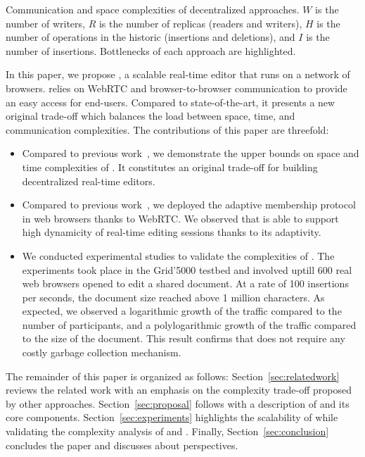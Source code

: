 \begin{table*}[t]
  \centering
  
  \caption{\label{table:complexities}
    Communication and space complexities of decentralized approaches.
    $W$ is the number of writers, 
    $R$ is the number of replicas (readers and writers),
    $H$ is the number of operations in the historic (insertions and deletions),
    and $I$ is the number of insertions.
    Bottlenecks of each approach are highlighted.}
\end{table*}

In this paper, we propose \CRATE, a scalable real-time editor that runs on a
network of browsers. \CRATE relies on WebRTC and browser-to-browser
communication to provide an easy access for end-users. Compared to
state-of-the-art, it presents a new original trade-off which balances the load
between space, time, and communication complexities. The contributions of this
paper are threefold:
\begin{itemize}
\item Compared to previous work~\cite{nedelec2013lseq}, we demonstrate the upper
  bounds on space and time complexities of \LSEQ. It constitutes an original
  trade-off for building decentralized real-time editors.
\item Compared to previous work~\cite{nedelec2015spray}, we deployed the
  adaptive membership protocol \SPRAY in web browsers thanks to
  WebRTC. We observed that \SPRAY is able to support high dynamicity
  of real-time editing sessions thanks to its adaptivity.
\item We conducted experimental studies to validate the complexities of
  \CRATE. The experiments took place in the Grid'5000 testbed and involved
  uptill $600$ real web browsers opened to edit a shared document. At a rate of
  100 insertions per seconds, the document size reached above 1 million
  characters. As expected, we observed a logarithmic growth of the traffic
  compared to the number of participants, and a polylogarithmic growth of the
  traffic compared to the size of the document. This result confirms that \CRATE
  does not require any costly garbage collection mechanism.
\end{itemize}

The remainder of this paper is organized as follows:
Section~\ref{sec:relatedwork} reviews the related work with an emphasis on the
complexity trade-off proposed by other approaches. Section~\ref{sec:proposal}
follows with a description of \CRATE and its core
components. Section~\ref{sec:experiments} highlights the scalability of \CRATE
while validating the complexity analysis of \LSEQ and \SPRAY. Finally,
Section~\ref{sec:conclusion} concludes the paper and discusses about
perspectives.

